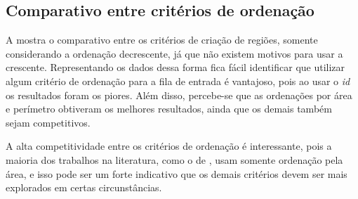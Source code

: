 \subsection{Comparativo entre critérios de ordenação}\label{subsec:comparativo-entre-criterios-de-ordenacao}

A  mostra o comparativo entre os critérios de criação de regiões,
somente considerando a ordenação decrescente, já que não existem motivos para usar a crescente.
Representando os dados dessa forma fica fácil identificar que utilizar algum critério de ordenação
para a fila de entrada é vantajoso, pois ao usar o \textit{id} os resultados foram os piores.
Além disso, percebe-se que as ordenações por área e perímetro obtiveram os melhores resultados,
ainda que os demais também sejam competitivos.



A alta competitividade entre os critérios de ordenação é interessante, pois a maioria dos trabalhos
na literatura, como o de , usam somente ordenação pela área, e
isso pode ser um forte indicativo que os demais critérios devem ser mais explorados em certas
circunstâncias.
